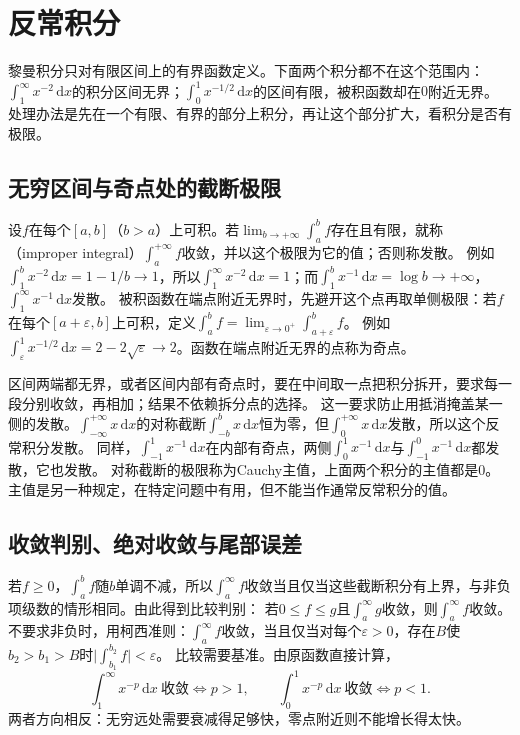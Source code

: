 \section{反常积分}
\label{sec:ru-improper-integrals}

黎曼积分只对有限区间上的有界函数定义。下面两个积分都不在这个范围内：$\int_1^\infty x^{-2}\,\mathrm dx$的积分区间无界；$\int_0^1x^{-1/2}\,\mathrm dx$的区间有限，被积函数却在$0$附近无界。
处理办法是先在一个有限、有界的部分上积分，再让这个部分扩大，看积分是否有极限。

\subsection{无穷区间与奇点处的截断极限}
\label{sec:ru-improper-definition}

设$f$在每个$[a,b]$（$b>a$）上可积。若$\lim_{b\to+\infty}\int_a^bf$存在且有限，就称（improper integral）$\int_a^{+\infty}f$收敛，并以这个极限为它的值；否则称发散。
例如$\int_1^bx^{-2}\,\mathrm dx=1-1/b\to1$，所以$\int_1^\infty x^{-2}\,\mathrm dx=1$；而$\int_1^bx^{-1}\,\mathrm dx=\log b\to+\infty$，$\int_1^\infty x^{-1}\,\mathrm dx$发散。
被积函数在端点附近无界时，先避开这个点再取单侧极限：若$f$在每个$[a+\varepsilon,b]$上可积，定义$\int_a^bf=\lim_{\varepsilon\to0^+}\int_{a+\varepsilon}^bf$。
例如$\int_\varepsilon^1x^{-1/2}\,\mathrm dx=2-2\sqrt\varepsilon\to2$。函数在端点附近无界的点称为奇点。

区间两端都无界，或者区间内部有奇点时，要在中间取一点把积分拆开，要求每一段分别收敛，再相加；结果不依赖拆分点的选择。
这一要求防止用抵消掩盖某一侧的发散。$\int_{-\infty}^{+\infty}x\,\mathrm dx$的对称截断$\int_{-b}^bx\,\mathrm dx$恒为零，但$\int_0^{+\infty}x\,\mathrm dx$发散，所以这个反常积分发散。
同样，$\int_{-1}^1x^{-1}\,\mathrm dx$在内部有奇点，两侧$\int_0^1x^{-1}\,\mathrm dx$与$\int_{-1}^0x^{-1}\,\mathrm dx$都发散，它也发散。
对称截断的极限称为Cauchy主值，上面两个积分的主值都是$0$。主值是另一种规定，在特定问题中有用，但不能当作通常反常积分的值。

\subsection{收敛判别、绝对收敛与尾部误差}
\label{sec:ru-improper-tests}

若$f\geq0$，$\int_a^bf$随$b$单调不减，所以$\int_a^\infty f$收敛当且仅当这些截断积分有上界，与非负项级数的情形相同。由此得到比较判别：
若$0\leq f\leq g$且$\int_a^\infty g$收敛，则$\int_a^\infty f$收敛。不要求非负时，用柯西准则：$\int_a^\infty f$收敛，当且仅当对每个$\varepsilon>0$，存在$B$使$b_2>b_1>B$时$\bigl|\int_{b_1}^{b_2}f\bigr|<\varepsilon$。
比较需要基准。由原函数直接计算，
\[
 \int_1^\infty x^{-p}\,\mathrm dx\ \text{收敛}\iff p>1,\qquad\int_0^1x^{-p}\,\mathrm dx\ \text{收敛}\iff p<1.
\]
两者方向相反：无穷远处需要衰减得足够快，零点附近则不能增长得太快。

